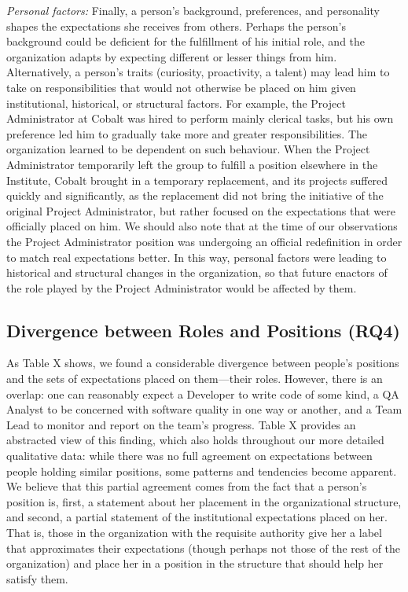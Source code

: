 \documentclass[10pt, conference, compsocconf]{IEEEtran}
\begin{document}
\emph{Personal factors:} Finally, a person's background, preferences, and personality shapes the expectations she receives from others. Perhaps the person's background could be deficient for the fulfillment of his initial role, and the organization adapts by expecting different or lesser things from him. Alternatively, a person's traits (curiosity, proactivity, a talent) may lead him to take on responsibilities that would not otherwise be placed on him given institutional, historical, or structural factors. For example, the Project Administrator at Cobalt was hired to perform mainly clerical tasks, but his own preference led him to gradually take more and greater responsibilities. The organization learned to be dependent on such behaviour. When the Project Administrator temporarily left the group to fulfill a position elsewhere in the Institute, Cobalt brought in a temporary replacement, and its projects suffered quickly and significantly, as the replacement did not bring the initiative of the original Project Administrator, but rather focused on the expectations that were officially placed on him. We should also note that at the time of our observations the Project Administrator position was undergoing an official redefinition in order to match real expectations better. In this way, personal factors were leading to historical and structural changes in the organization, so that future enactors of the role played by the Project Administrator would be affected by them.


\subsection{Divergence between Roles and Positions (RQ4)}

As Table X shows, we found a considerable divergence between people's positions and the sets of expectations placed on them---their roles. However, there is an overlap: one can reasonably expect a Developer to write code of some kind, a QA Analyst to be concerned with software quality in one way or another, and a Team Lead to monitor and report on the team's progress. Table X provides an abstracted view of this finding, which also holds throughout our more detailed qualitative data: while there was no full agreement on expectations between people holding similar positions, some patterns and tendencies become apparent. We believe that this partial agreement comes from the fact that a person's position is, first, a statement about her placement in the organizational structure, and second, a partial statement of the institutional expectations placed on her. That is, those in the organization with the requisite authority give her a label that approximates their expectations (though perhaps not those of the rest of the organization) and place her in a position in the structure that should help her satisfy them.
\end{document}
